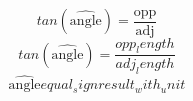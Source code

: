 \[tan(\widehat{{\text{{{angle}}}}})=\frac{{\text{{{opp}}}}}{{\text{{{adj}}}}}\]
\[tan(\widehat{{\text{{{angle}}}}})=\frac{{{opp_length}}}{{{adj_length}}}\]
\[\widehat{{\text{{{angle}}}}}{equal_sign}{result_with_unit}\]
